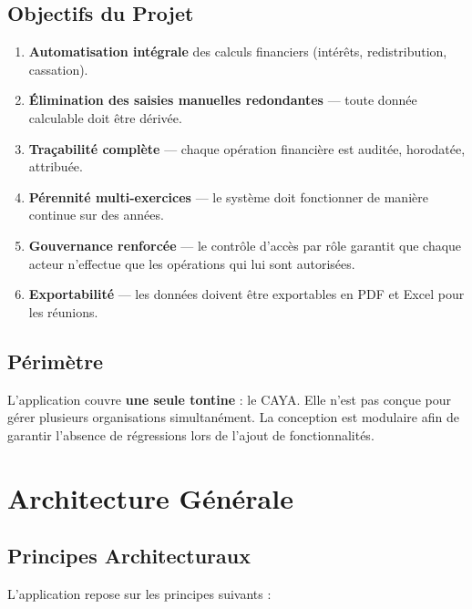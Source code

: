 \documentclass[12pt, a4paper]{report}
\begin{document}
\section{Objectifs du Projet}

\begin{enumerate}[label=\textbf{O\arabic*.}]
  \item \textbf{Automatisation intégrale} des calculs financiers (intérêts, redistribution, cassation).
  \item \textbf{Élimination des saisies manuelles redondantes} — toute donnée calculable doit être dérivée.
  \item \textbf{Traçabilité complète} — chaque opération financière est auditée, horodatée, attribuée.
  \item \textbf{Pérennité multi-exercices} — le système doit fonctionner de manière continue sur des années.
  \item \textbf{Gouvernance renforcée} — le contrôle d'accès par rôle garantit que chaque acteur n'effectue
        que les opérations qui lui sont autorisées.
  \item \textbf{Exportabilité} — les données doivent être exportables en PDF et Excel pour les réunions.
\end{enumerate}

\section{Périmètre}

L'application couvre \textbf{une seule tontine} : le CAYA. Elle n'est pas conçue pour gérer plusieurs
organisations simultanément. La conception est modulaire afin de garantir l'absence de régressions
lors de l'ajout de fonctionnalités.

\chapter{Architecture Générale}

\section{Principes Architecturaux}

L'application repose sur les principes suivants :
\end{document}
